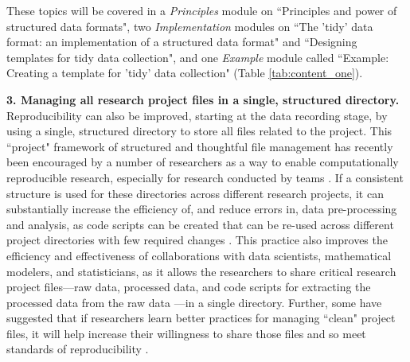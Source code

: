 \documentclass[pdftex,english,11.5pt,parskip=half]{scrartcl}
\begin{document}
These topics will
be covered in a \textit{Principles} module on ``Principles and power of
structured data formats", two \textit{Implementation} modules on ``The 'tidy'
data format: an implementation of a structured data format" and ``Designing
templates for tidy data collection", and one \textit{Example} module called
``Example: Creating a template for 'tidy' data collection" (Table \ref*{tab:content_one}). 

\textbf{3. Managing all research project files in a single, structured directory.}
Reproducibility can also be improved, starting at the data recording stage, by using a single, structured directory to store all files related to the
project. This ``project" framework of structured and thoughtful file management has recently been encouraged by a number of
researchers as a way to enable computationally reproducible research, especially
for research conducted by teams \cite{marwick2018packaging,
parker2017opinionated, lowndes2017our}. If a consistent structure is used for these directories across different research projects, it can substantially increase the efficiency of, and reduce errors in, data pre-processing and analysis, as code scripts can be created that can be re-used across different project directories with few required changes \cite{marwick2018packaging}. This practice also improves the efficiency and effectiveness of collaborations with data scientists, mathematical modelers, and statisticians, as it allows the researchers to share critical research project files---raw data, processed data, and code scripts for extracting the processed data from the raw data \cite{ellis2018share, shade2015computing}---in a single directory. Further, some have suggested that if researchers learn better practices for managing ``clean" project files, it will help increase their willingness to share those files and so meet standards of reproducibility \cite{marwick2018packaging}. 
\end{document}
